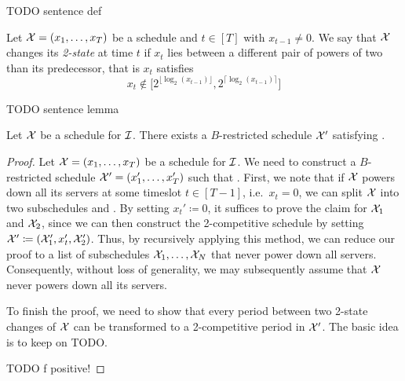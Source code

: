 TODO sentence def
\begin{defn}
Let $\mathcal{X}=(x_1,\dotsc,x_T)$ be a schedule and $t\in[T]$ with $x_{t-1}\neq 0$. We say that $\mathcal{X}$ changes its \emph{2-state} at time $t$ if $x_t$ lies between a different pair of powers of two than its predecessor, that is $x_t$ satisfies
\begin{equation*}
	x_t\notin\bigl[2^{\lfloor \log_2(x_{t-1})\rfloor},2^{\lceil \log_2(x_{t-1})\rceil}\bigr]
\end{equation*}
\end{defn}
TODO sentence lemma
\begin{lem}\label{lem:transform_schedule_approx_2}
Let $\mathcal{X}$ be a schedule for $\mathcal{I}$. There exists a $B$-restricted schedule $\mathcal{X}'$ satisfying .
\end{lem}
\begin{proof}
Let $\mathcal{X}=(x_1,\dotsc,x_T)$ be a schedule for $\mathcal{I}$. We need to construct a $B$-restricted schedule $\mathcal{X}'=(x_1',\dotsc,x_T')$ such that .
First, we note that if $\mathcal{X}$ powers down all its servers at some timeslot $t\in[T-1]$, i.e.\ $x_t=0$, we can split $\mathcal{X}$ into two subschedules  and . By setting $x_t'\coloneqq0$, it suffices to prove the claim for $\mathcal{X}_1$ and $\mathcal{X}_2$, since we can then construct the 2-competitive schedule by setting $\mathcal{X}'\coloneqq(\mathcal{X}_1',x_t',\mathcal{X}_2')$. Thus, by recursively applying this method, we can reduce our proof to a list of subschedules $\mathcal{X}_1,\dotsc,\mathcal{X}_N$ that never power down all servers. Consequently, without loss of generality, we may subsequently assume that $\mathcal{X}$ never powers down all its servers. 
	
To finish the proof, we need to show that every period between two 2-state changes of $\mathcal{X}$ can be transformed to a 2-competitive period in $\mathcal{X}'$. The basic idea is to keep on TODO.

TODO f positive!


\end{proof}
